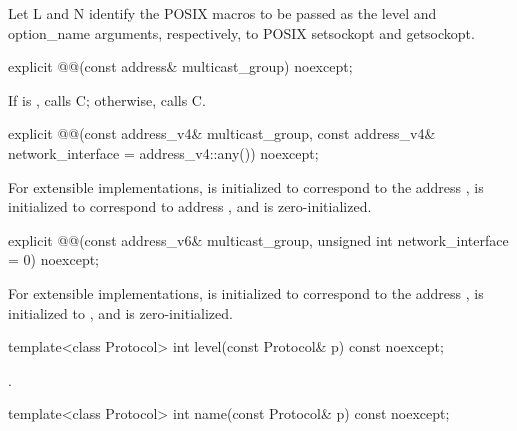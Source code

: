 \pnum
Let L and N identify the POSIX macros to be passed as the level and option_name arguments, respectively, to POSIX setsockopt and getsockopt.

\begin{itemdecl}
explicit @@(const address& multicast_group) noexcept;
\end{itemdecl}

\begin{itemdescr}
\pnum
\effects If  is , calls C; otherwise, calls C.
\end{itemdescr}

\begin{itemdecl}
explicit @@(const address_v4& multicast_group,
           const address_v4& network_interface = address_v4::any()) noexcept;
\end{itemdecl}

\begin{itemdescr}
\pnum
\effects For extensible implementations,  is initialized to correspond to the address ,  is initialized to correspond to address , and  is zero-initialized.
\end{itemdescr}

\begin{itemdecl}
explicit @@(const address_v6& multicast_group,
           unsigned int network_interface = 0) noexcept;
\end{itemdecl}

\begin{itemdescr}
\pnum
\effects For extensible implementations,  is initialized to correspond to the address ,  is initialized to , and  is zero-initialized.
\end{itemdescr}

\begin{itemdecl}
template<class Protocol> int level(const Protocol& p) const noexcept;
\end{itemdecl}

\begin{itemdescr}
\pnum
\returns {}.
\end{itemdescr}

\begin{itemdecl}
template<class Protocol> int name(const Protocol& p) const noexcept;
\end{itemdecl}


